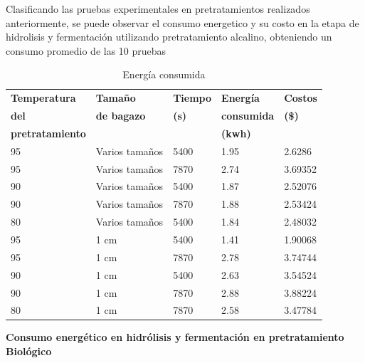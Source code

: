 \documentclass[12pt]{article}
\begin{document}
	Clasificando las pruebas experimentales en pretratamientos realizados anteriormente, se puede observar el consumo energetico y su costo en la etapa de hidrolisis y fermentación utilizando pretratamiento alcalino, obteniendo un consumo promedio de las 10 pruebas
			
			
			\begin{table}[H]
				\centering
				\label{energi_}
				\caption{Energía consumida }
					{\fontsize{9}{10.8}\selectfont
				\begin{tabular}{|l|l|l|l|l|}
					\hline
		\textbf{Temperatura} & \textbf{Tamaño } & \textbf{Tiempo} & \textbf{Energía } & \textbf{Costos } \\ 
				\textbf{del} &	\textbf{ de bagazo}  &	\textbf{ (s)} & 	\textbf{consumida  }& 	\textbf{(\$)} \\ 
	\textbf{pretratamiento}  &  &  & \textbf{(kwh)} &  \\ \hline
					95 & Varios  tamaños & 5400 & 1.95 & 2.6286  \\ \hline
					95 & Varios  tamaños & 7870 & 2.74 & 3.69352  \\ \hline
					90 & Varios  tamaños & 5400 & 1.87 & 2.52076  \\ \hline
					90 & Varios  tamaños & 7870 & 1.88 & 2.53424  \\ \hline
					80 & Varios  tamaños & 5400 & 1.84 & 2.48032  \\ \hline
					95 & 1 cm & 5400 & 1.41 & 1.90068  \\ \hline
					95 & 1 cm  & 7870 & 2.78 & 3.74744  \\ \hline
					90 & 1 cm  & 5400 & 2.63 & 3.54524  \\ \hline
					90 & 1 cm  & 7870 & 2.88 & 3.88224  \\ \hline
					80 & 1 cm & 7870 & 2.58 & 3.47784  \\ \hline
				\end{tabular}}

			\end{table}


		


	\textbf{ Consumo energético en hidrólisis y fermentación en pretratamiento Biológico }
	
\end{document}
